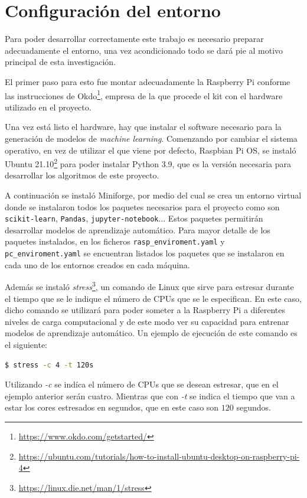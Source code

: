 \documentclass[a4paper, 12pt]{book}
\begin{document}
\section{Configuración del entorno}
\label{sec:configuracion_entorno}

Para poder desarrollar correctamente este trabajo es necesario preparar adecuadamente el entorno, una vez acondicionado todo se dará pie al motivo principal de esta investigación.

El primer paso para esto fue montar adecuadamente la Raspberry Pi conforme las instrucciones de Okdo\footnote{\url{https://www.okdo.com/getstarted/}}, empresa de la que procede el kit con el hardware utilizado en el proyecto.

Una vez está listo el hardware, hay que instalar el software necesario para la generación de modelos de \textit{machine learning}.
Comenzando por cambiar el sistema operativo, en vez de utilizar el que viene por defecto, Raspbian Pi OS, se instaló Ubuntu 21.10\footnote{\url{https://ubuntu.com/tutorials/how-to-install-ubuntu-desktop-on-raspberry-pi-4}} para poder instalar Python 3.9, que es la versión necesaria para desarrollar los algoritmos de este proyecto.

A continuación se instaló Miniforge, por medio del cual se crea un entorno virtual donde se instalaron todos los paquetes necesarios para el proyecto como son \texttt{scikit-learn}, \texttt{Pandas}, \texttt{jupyter-notebook}... Estos paquetes permitirán desarrollar modelos de aprendizaje automático. Para mayor detalle de los paquetes instalados, en los ficheros \texttt{rasp\_enviroment.yaml} y \texttt{pc\_enviroment.yaml} se encuentran listados los paquetes que se instalaron en cada uno de los entornos creados en cada máquina.

Además se instaló \textit{stress}\footnote{\url{https://linux.die.net/man/1/stress}}, un comando de Linux que sirve para estresar durante el tiempo que se le indique el número de CPUs que se le especifican. En este caso, dicho comando se utilizará para poder someter a la Raspberry Pi a diferentes niveles de carga computacional y de este modo ver su capacidad para entrenar modelos de aprendizaje automático. Un ejemplo de ejecución de este comando es el siguiente:\\

\begin{lstlisting}[language=bash]
    $ stress -c 4 -t 120s
\end{lstlisting}

Utilizando \textit{-c} se indíca el número de CPUs que se desean estresar, que en el ejemplo anterior serán cuatro. Mientras que con \textit{-t} se indica el tiempo que van a estar los cores estresados en segundos, que en este caso son $120$ segundos.
\end{document}
